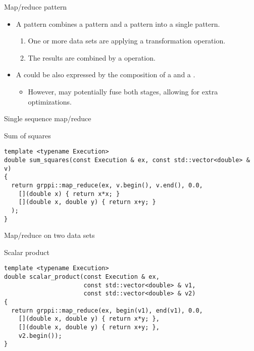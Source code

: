 \begin{frame}[t]{Map/reduce pattern}
\begin{itemize}
  \item A  pattern combines a  pattern and
        a  pattern into a single pattern.
    \begin{enumerate}
      \item One or more data sets are  applying a transformation operation.
      \item The results are combined by a  operation.
    \end{enumerate}
  \vfill
  \item A  could be also expressed by the composition of a
         and a . 
    \begin{itemize}
      \item However,  may potentially fuse both stages, 
            allowing for extra optimizations.
    \end{itemize}
\end{itemize}
\end{frame}

\begin{frame}[t,fragile]{Single sequence map/reduce}
\begin{block}{Sum of squares}
\begin{lstlisting}
template <typename Execution>
double sum_squares(const Execution & ex, const std::vector<double> & v)
{
  return grppi::map_reduce(ex, v.begin(), v.end(), 0.0,
    [](double x) { return x*x; }
    [](double x, double y) { return x+y; }
  );
}
\end{lstlisting}
\end{block}
\end{frame}

\begin{frame}[t,fragile]{Map/reduce on two data sets}
\begin{block}{Scalar product}
\begin{lstlisting}
template <typename Execution>
double scalar_product(const Execution & ex,
                      const std::vector<double> & v1,
                      const std::vector<double> & v2)
{
  return grppi::map_reduce(ex, begin(v1), end(v1), 0.0,
    [](double x, double y) { return x*y; },
    [](double x, double y) { return x+y; },
    v2.begin());
}
\end{lstlisting}
\end{block}
\end{frame}

